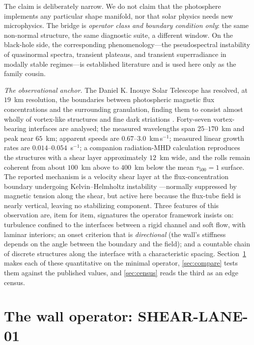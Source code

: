 \documentclass[11pt]{article}
\renewcommand{\S}{\mathhexbox278}
\theoremstyle{definition}
\theoremstyle{remark}
\begin{document}
The claim is deliberately narrow. We do not claim that the photosphere
implements any particular shape manifold, nor that solar physics needs new
microphysics. The bridge is \emph{operator class and boundary condition
only}: the same non-normal structure, the same diagnostic suite, a different
window. On the black-hole side, the corresponding phenomenology---the
pseudospectral instability of quasinormal spectra, transient plateaus, and
transient superradiance in modally stable regimes---is established literature
\cite{jaramillo,gasperin,besson,carballo} and is used here only as the family
cousin.

\emph{The observational anchor.} The Daniel K. Inouye Solar Telescope has
resolved, at $19$~km resolution, the boundaries between photospheric magnetic
flux concentrations and the surrounding granulation, finding them to consist
almost wholly of vortex-like structures and fine dark striations
\cite{dkist,rimmele}. Forty-seven vortex-bearing interfaces are analysed;
the measured wavelengths span $25$--$170$~km and peak near $65$~km; apparent
speeds are $0.67$--$3.0$~km\,s$^{-1}$; measured linear growth rates are
$0.014$--$0.054$~s$^{-1}$; a companion radiation-MHD calculation reproduces
the structures with a shear layer approximately $12$~km wide, and the rolls
remain coherent from about $100$~km above to $400$~km below the mean
$\tau_{500}=1$ surface. The reported mechanism is a velocity shear layer at
the flux-concentration boundary undergoing Kelvin--Helmholtz instability
---normally suppressed by magnetic tension along the shear, but active here
because the flux-tube field is nearly vertical, leaving no stabilizing
component. Three features of this observation are, item for item, signatures
the operator framework insists on: turbulence confined to the interfaces
between a rigid channel and soft flow, with laminar interiors; an onset
criterion that is \emph{directional} (the wall's stiffness depends on the
angle between the boundary and the field); and a countable chain of discrete
structures along the interface with a characteristic spacing.
Section~\ref{sec:lane} makes each of these quantitative on the minimal
operator, \S\ref{sec:compare} tests them against the published values, and
\S\ref{sec:census} reads the third as an edge census.

\section{The wall operator: SHEAR-LANE-01}\label{sec:lane}
\end{document}
